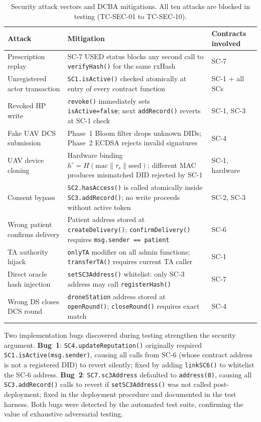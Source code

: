 \documentclass[sigplan,screen]{acmart}
\newcommand{\dcba}{\textsc{DCBA}\xspace}
\begin{document}
\begin{table}[t]
\caption{Security attack vectors and \dcba mitigations. All ten attacks are
  blocked in testing (TC-SEC-01 to TC-SEC-10).}
\label{tab:security}
\small
\begin{tabular}{@{}p{3.1cm}p{5.5cm}p{4.5cm}@{}}
\toprule
\textbf{Attack} & \textbf{Mitigation} & \textbf{Contracts involved} \\
\midrule
Prescription replay
  & SC-7 USED status blocks any second call to \texttt{verifyHash()}
    for the same rxHash
  & SC-7 \\
Unregistered actor transaction
  & \texttt{SC1.isActive()} checked atomically at entry of every contract
    function
  & SC-1 + all SCs \\
Revoked HP write
  & \texttt{revoke()} immediately sets \texttt{isActive=false};
    next \texttt{addRecord()} reverts at SC-1 check
  & SC-1, SC-3 \\
Fake UAV DCS submission
  & Phase~1 Bloom filter drops unknown DIDs; Phase~2 ECDSA rejects
    invalid signatures
  & SC-4 \\
UAV device cloning
  & Hardware binding $h^\circ = H(\text{mac}\|\tau_s\|\text{seed})$;
    different MAC produces mismatched DID rejected by SC-1
  & SC-1, hardware \\
Consent bypass
  & \texttt{SC2.hasAccess()} is called atomically inside
    \texttt{SC3.addRecord()}; no write proceeds without active token
  & SC-2, SC-3 \\
Wrong patient confirms delivery
  & Patient address stored at \texttt{createDelivery()};
    \texttt{confirmDelivery()} requires \texttt{msg.sender == patient}
  & SC-6 \\
TA authority hijack
  & \texttt{onlyTA} modifier on all admin functions;
    \texttt{transferTA()} requires current TA caller
  & SC-1 \\
Direct oracle hash injection
  & \texttt{setSC3Address()} whitelist: only SC-3 address may call
    \texttt{registerHash()}
  & SC-7 \\
Wrong DS closes DCS round
  & \texttt{droneStation} address stored at \texttt{openRound()};
    \texttt{closeRound()} requires exact match
  & SC-4 \\
\bottomrule
\end{tabular}
\end{table}

Two implementation bugs discovered during testing strengthen the security
argument.
\textbf{Bug~1}: \texttt{SC4.updateReputation()} originally required
\texttt{SC1.isActive(msg.sender)}, causing all calls from SC-6 (whose contract
address is not a registered DID) to revert silently; fixed by adding
\texttt{linkSC6()} to whitelist the SC-6 address.
\textbf{Bug~2}: \texttt{SC7.sc3Address} defaulted to \texttt{address(0)},
causing all \texttt{SC3.addRecord()} calls to revert if \texttt{setSC3Address()}
was not called post-deployment; fixed in the deployment procedure and documented
in the test harness.
Both bugs were detected by the automated test suite, confirming the value of
exhaustive adversarial testing.
\end{document}
